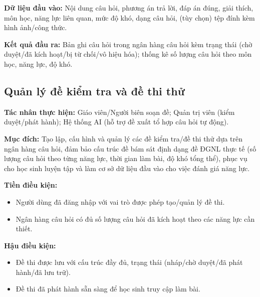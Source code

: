 \documentclass[12pt,a4paper]{article}
\newcommand{\ucfield}[2]{\noindent\textbf{#1: } #2\par\vspace{0.35em}}
\begin{document}
	\ucfield{Dữ liệu đầu vào}{Nội dung câu hỏi, phương án trả lời, đáp án đúng, giải thích, môn học, năng lực liên quan, mức độ khó, dạng câu hỏi, (tùy chọn) tệp đính kèm hình ảnh/công thức.}
	
	\ucfield{Kết quả đầu ra}{Bản ghi câu hỏi trong ngân hàng câu hỏi kèm trạng thái (chờ duyệt/đã kích hoạt/bị từ chối/vô hiệu hóa); thống kê số lượng câu hỏi theo môn học, năng lực, độ khó.}
	
	\subsection{Quản lý đề kiểm tra và đề thi thử}
	
	\ucfield{Tác nhân thực hiện}{Giáo viên/Người biên soạn đề; Quản trị viên (kiểm duyệt/phát hành); Hệ thống AI (hỗ trợ đề xuất tổ hợp câu hỏi tự động).}
	
	\ucfield{Mục đích}{Tạo lập, cấu hình và quản lý các đề kiểm tra/đề thi thử dựa trên ngân hàng câu hỏi, đảm bảo cấu trúc đề bám sát định dạng đề ĐGNL thực tế (số lượng câu hỏi theo từng năng lực, thời gian làm bài, độ khó tổng thể), phục vụ cho học sinh luyện tập và làm cơ sở dữ liệu đầu vào cho việc đánh giá năng lực.}
	
	\ucfield{Tiền điều kiện}{
		\begin{itemize}[nosep]
			\item Người dùng đã đăng nhập với vai trò được phép tạo/quản lý đề thi.
			\item Ngân hàng câu hỏi có đủ số lượng câu hỏi đã kích hoạt theo các năng lực cần thiết.
	\end{itemize}}
	
	\ucfield{Hậu điều kiện}{
		\begin{itemize}[nosep]
			\item Đề thi được lưu với cấu trúc đầy đủ, trạng thái (nháp/chờ duyệt/đã phát hành/đã lưu trữ).
			\item Đề thi đã phát hành sẵn sàng để học sinh truy cập làm bài.
	\end{itemize}}
	
\end{document}

